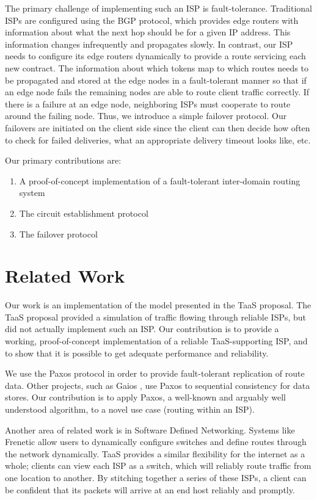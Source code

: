 \documentclass{article}
\begin{document}
The primary challenge of implementing such an ISP is
fault-tolerance. Traditional ISPs are configured using the BGP
protocol, which provides edge routers with information about what the
next hop should be for a given IP address. This information changes
infrequently and propagates slowly. In contrast, our ISP needs to
configure its edge routers dynamically to provide a route servicing
each new contract. The information about which tokens map to which
routes needs to be propagated and stored at the edge nodes in a
fault-tolerant manner so that if an edge node fails the remaining
nodes are able to route client traffic correctly. If there is a
failure at an edge node, neighboring ISPs must cooperate to route
around the failing node. Thus, we introduce a simple failover
protocol. Our failovers are initiated on the client side since the
client can then decide how often to check for failed deliveries, what
an appropriate delivery timeout looks like, etc.

Our primary contributions are:
\begin{enumerate}
\item A proof-of-concept implementation of a fault-tolerant
  inter-domain routing system
\item The circuit establishment protocol
\item The failover protocol
\end{enumerate}

\section{Related Work}
Our work is an implementation of the model presented in the TaaS
proposal. The TaaS proposal \cite{taas} provided a simulation of
traffic flowing through reliable ISPs, but did not actually implement
such an ISP. Our contribution is to provide a working,
proof-of-concept implementation of a reliable TaaS-supporting ISP, and
to show that it is possible to get adequate performance and
reliability.

We use the Paxos protocol \cite{paxos} in order to provide
fault-tolerant replication of route data. Other projects, such as
Gaios \cite{gaios}, use Paxos to sequential consistency for data
stores. Our contribution is to apply Paxos, a well-known and arguably
well understood algorithm, to a novel use case (routing within an
ISP).

Another area of related work is in Software Defined
Networking. Systems like Frenetic \cite{frenetic} allow users to
dynamically configure switches and define routes through the network
dynamically. TaaS provides a similar flexibility for the internet as a
whole; clients can view each ISP as a switch, which will reliably
route traffic from one location to another. By stitching together a
series of these ISPs, a client can be confident that its packets will
arrive at an end host reliably and promptly.
\end{document}
